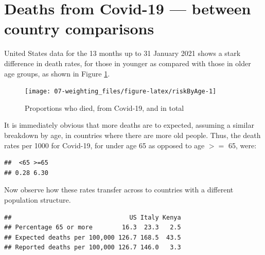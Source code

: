 \documentclass[
  10pt,
  b5paper]{book}
\newenvironment{Shaded}{\begin{snugshade}}{\end{snugshade}}
\newcommand{\DecValTok}[1]{\textcolor[rgb]{0.00,0.00,0.81}{#1}}
\newcommand{\FunctionTok}[1]{\textcolor[rgb]{0.00,0.00,0.00}{#1}}
\newcommand{\NormalTok}[1]{#1}
\newcommand{\OtherTok}[1]{\textcolor[rgb]{0.56,0.35,0.01}{#1}}
\newcommand{\SpecialCharTok}[1]{\textcolor[rgb]{0.00,0.00,0.00}{#1}}
\newcommand{\StringTok}[1]{\textcolor[rgb]{0.31,0.60,0.02}{#1}}
\begin{document}
\hypertarget{deaths-from-covid-19-between-country-comparisons}{%
\section{Deaths from Covid-19 --- between country comparisons}\label{deaths-from-covid-19-between-country-comparisons}}

United States data for the 13 months up to 31 January 2021 shows
a stark difference in death rates, for those in younger as
compared with those in older age groups, as shown in Figure
\ref{fig:riskByAge}.

\begin{Shaded}
\end{Shaded}

\begin{figure}
\texttt{[image: 07-weighting\_files/figure-latex/riskByAge-1]} \caption{Proportions who died, from Covid-19, and in total}\label{fig:riskByAge}
\end{figure}

It is immediately obvious that more deaths are to expected, assuming a similar
breakdown by age, in countries where there are more old people. Thus, the
death rates per 1000 for Covid-19, for under age 65 as opposed to age \(>=\) 65,
were:

\begin{verbatim}
##  <65 >=65 
## 0.28 6.30
\end{verbatim}

Now observe how these rates transfer across to countries with a different population
structure.

\begin{verbatim}
##                                US Italy Kenya
## Percentage 65 or more        16.3  23.3   2.5
## Expected deaths per 100,000 126.7 168.5  43.5
## Reported deaths per 100,000 126.7 146.0   3.3
\end{verbatim}
\end{document}
